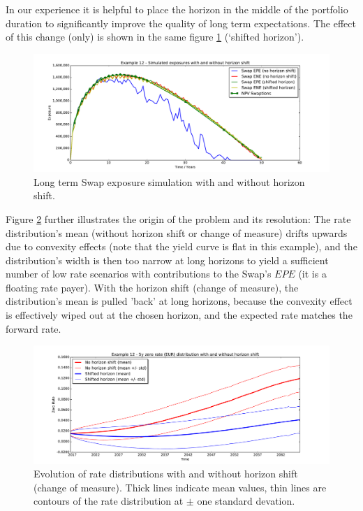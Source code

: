 \documentclass[12pt, a4paper]{article}
\newcommand{\EPE}{\mathit{EPE}}
\begin{document}
In our experience it is helpful to place the horizon in the middle of the portfolio duration to significantly improve
the quality of long term expectations. The effect of this change (only) is shown in the same figure \ref{fig_15}
(`shifted horizon').
\begin{figure}[h!]
\begin{center}
\includegraphics[scale=0.45]{mpl_longterm.pdf}
\end{center}
\caption{Long term Swap exposure simulation with and without horizon shift.}
\label{fig_15}
\end{figure}
Figure \ref{fig_15b} further illustrates the origin of the problem and its resolution: The rate distribution's mean
(without horizon shift or change of measure) drifts upwards due to convexity effects (note that the yield curve is flat
in this example), and the distribution's width is then too narrow at long horizons to yield a sufficient number of low
rate scenarios with contributions to the Swap's $\EPE$ (it is a floating rate payer). With the horizon shift (change of
measure), the distribution's mean is pulled 'back' at long horizons, because the convexity effect is effectively wiped
out at the chosen horizon, and the expected rate matches the forward rate.

\begin{figure}[h!]
\begin{center}
\includegraphics[scale=0.45]{mpl_rates.pdf}
\end{center}
\caption{Evolution of rate distributions with and without horizon shift (change of measure). Thick lines indicate mean
  values, thin lines are contours of the rate distribution at $\pm$ one standard devation.}
\label{fig_15b}
\end{figure}
\end{document}
